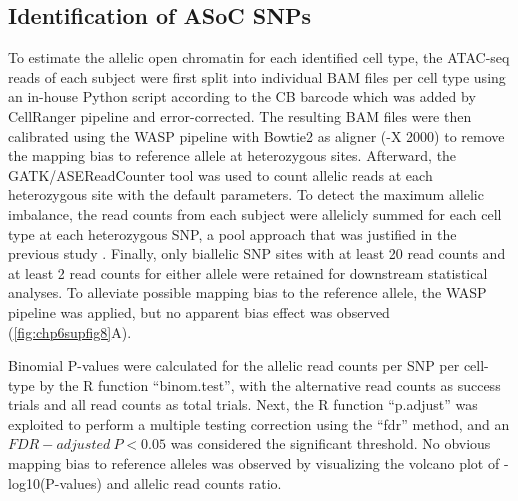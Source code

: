 \documentclass{book}
\begin{document}
\begin{refsection}
\subsection*{Identification of ASoC SNPs}
To estimate the allelic open chromatin for each identified cell type, the ATAC-seq reads of each subject were first split into individual BAM files per cell type using an in-house Python script according to the CB barcode which was added by CellRanger pipeline and error-corrected.
The resulting BAM files were then calibrated using the WASP pipeline \cite{van2015WASP} with Bowtie2 \cite{Langmead2012Fast} as aligner (-X 2000) to remove the mapping bias to reference allele at heterozygous sites.
Afterward, the GATK/ASEReadCounter \cite{Castel2015Tools} tool was used to count allelic reads at each heterozygous site with the default parameters.
To detect the maximum allelic imbalance, the read counts from each subject were allelicly summed for each cell type at each heterozygous SNP, a pool approach that was justified in the previous study \cite{Zhang2020Allele}.
Finally, only biallelic SNP sites with at least 20 read counts and at least 2 read counts for either allele were retained for downstream statistical analyses.
To alleviate possible mapping bias to the reference allele, the WASP pipeline was applied, but no apparent bias effect was observed (\ref{fig:chp6supfig8}A).

Binomial P-values were calculated for the allelic read counts per SNP per cell-type by the R function \enquote{binom.test}, with the alternative read counts as success trials and all read counts as total trials.
Next, the R function \enquote{p.adjust} was exploited to perform a multiple testing correction using the “fdr” method, and an $FDR-adjusted~P < 0.05$ was considered the significant threshold.
No obvious mapping bias to reference alleles was observed by visualizing the volcano plot of -log10(P-values) and allelic read counts ratio.


\end{refsection}
\end{document}
